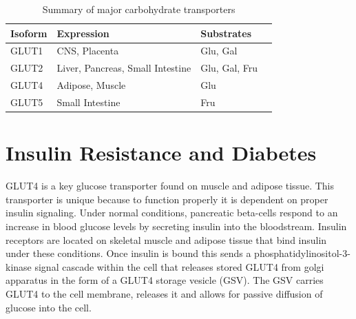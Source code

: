 \documentclass{tufte-handout}
\begin{document}
\begin{table}[]
\caption{Summary of major carbohydrate transporters}
\begin{tabular}{llll}\toprule
\label{tab:glut-transporters}
\textbf{Isoform} & \textbf{Expression}              & \textbf{Substrates} \\ \midrule
GLUT1            & CNS, Placenta                    & Glu, Gal             \\
GLUT2            & Liver, Pancreas, Small Intestine & Glu, Gal, Fru        \\
GLUT4            & Adipose, Muscle                  & Glu                    \\
GLUT5            & Small Intestine                  & Fru                 \\ \bottomrule
\end{tabular}

\end{table}


\section{Insulin Resistance and Diabetes}

GLUT4 is a key glucose transporter found on muscle and adipose tissue. This transporter is unique because to function properly it is dependent on proper insulin signaling. Under normal conditions, pancreatic beta-cells respond to an increase in blood glucose levels by secreting insulin into the bloodstream. Insulin receptors are located on skeletal muscle and adipose tissue that bind insulin under these conditions. Once insulin is bound this sends a phosphatidylinositol-3-kinase signal cascade within the cell that releases stored GLUT4 from golgi apparatus in the form of a GLUT4 storage vesicle (GSV). The GSV carries GLUT4 to the cell membrane, releases it and allows for passive diffusion of glucose into the cell.
\end{document}
